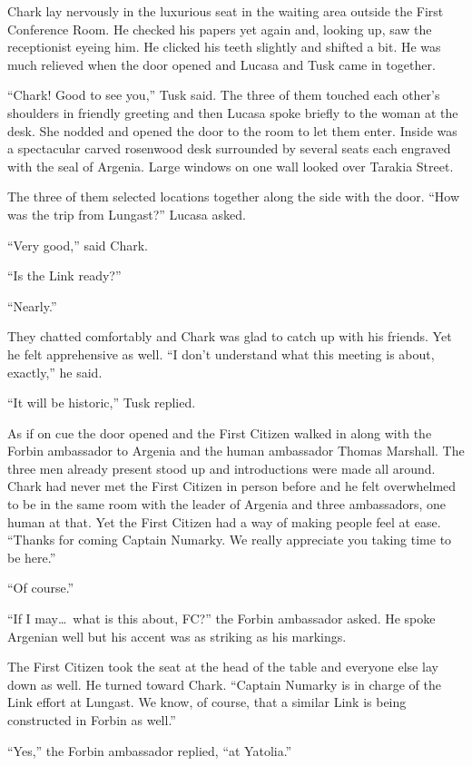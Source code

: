 
Chark lay nervously in the luxurious seat in the waiting area outside the First Conference Room.
He checked his papers yet again and, looking up, saw the receptionist eyeing him. He clicked his
teeth slightly and shifted a bit. He was much relieved when the door opened and Lucasa and Tusk
came in together.

``Chark! Good to see you,'' Tusk said. The three of them touched each other's shoulders in
friendly greeting and then Lucasa spoke briefly to the woman at the desk. She nodded and opened
the door to the room to let them enter. Inside was a spectacular carved rosenwood desk
surrounded by several seats each engraved with the seal of Argenia. Large windows on one wall
looked over Tarakia Street.

The three of them selected locations together along the side with the door. ``How was the trip
from Lungast?'' Lucasa asked.

``Very good,'' said Chark.

``Is the Link ready?''

``Nearly.''

They chatted comfortably and Chark was glad to catch up with his friends. Yet he felt
apprehensive as well. ``I don't understand what this meeting is about, exactly,'' he said.

``It will be historic,'' Tusk replied.

As if on cue the door opened and the First Citizen walked in along with the Forbin ambassador to
Argenia and the human ambassador Thomas Marshall. The three men already present stood up and
introductions were made all around. Chark had never met the First Citizen in person before and
he felt overwhelmed to be in the same room with the leader of Argenia and three ambassadors, one
human at that. Yet the First Citizen had a way of making people feel at ease. ``Thanks for
coming Captain Numarky. We really appreciate you taking time to be here.''

``Of course.''

``If I may\ldots\ what is this about, FC?'' the Forbin ambassador asked. He spoke Argenian well
but his accent was as striking as his markings.

The First Citizen took the seat at the head of the table and everyone else lay down as well. He
turned toward Chark. ``Captain Numarky is in charge of the Link effort at Lungast. We know, of
course, that a similar Link is being constructed in Forbin as well.''

``Yes,'' the Forbin ambassador replied, ``at Yatolia.''

